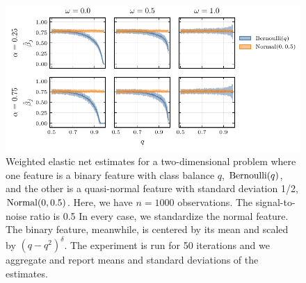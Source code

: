 \begin{figure}[htpb]
  \centering
  \includegraphics{plots/mixed_data_elnet.pdf}
  \caption{%
    Weighted elastic net estimates for a two-dimensional problem where one feature is a binary
    feature with class balance \(q\), \(\operatorname{Bernoulli}(q)\), and the other is a quasi-normal
    feature with standard deviation 1/2, \(\operatorname{Normal}(0, 0.5)\). Here, we have \(n = \num{1000}\)
    observations. The signal-to-noise ratio is 0.5 In every case, we standardize the normal
    feature. The binary feature, meanwhile, is centered by its mean and scaled by
    \((q-q^2)^\delta\). The experiment is run for 50 iterations and we aggregate and report
    means and standard deviations of the estimates. \label{fig:mixed-data-elnet}
  }
\end{figure}


